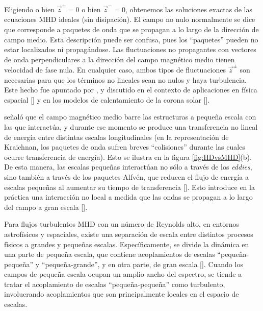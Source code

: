 Eligiendo o bien $\vec{z}^+ = 0$ o bien $\vec{z}^- = 0$, obtenemos las
soluciones exactas de las ecuaciones MHD ideales (sin disipación). El
campo no nulo normalmente se dice que corresponde a paquetes de onda
que se propagan a lo largo de la dirección de campo medio. Esta
descripción puede ser confusa, pues los ``paquetes'' pueden no estar
localizados ni propagándose. Las fluctuaciones no propagantes con
vectores de onda perpendiculares a la dirección del campo magnético
medio tienen velocidad de fase nula. En cualquier caso, ambos tipos de
fluctuaciones $\vec{z}^\pm$ son necesarias para que los términos no
lineales sean no nulos y haya turbulencia. Este hecho fue apuntado por
\cite{kraichnan_inertial-range_1965}, y discutido en el contexto de
aplicaciones en física espacial [\cite{dobrowolny_fully_1980}] y en
los modelos de calentamiento de la corona solar
[\cite{dmitruk_conditions_2001}].

\cite{kraichnan_inertial-range_1965} señaló que el campo
magnético medio barre las estructuras a pequeña escala con las que
interactúa, y durante ese momento se produce una transferencia no
lineal de energía entre distintas escalas longitudinales (en la
representación de Kraichnan, los paquetes de onda sufren breves
``colisiones'' durante las cuales ocurre transferencia de
energía). Esto se ilustra en la figura \ref{fig:HDvsMHD}(b). De esta
manera, las escalas pequeñas interactúan no sólo a través de los
\textit{eddies}, sino también a través de los paquetes Alfv\'en, que
reducen el flujo de energía a escalas pequeñas al aumentar su tiempo
de transferencia [\cite{chen_inhibition_1997}]. Esto introduce en la
práctica una interacción no local a medida que las ondas se propagan a
lo largo del campo a gran escala [\cite{gomez_validity_1999}].



Para flujos turbulentos MHD con un número de Reynolds alto, en
entornos astrofísicos y espaciales, existe una separación de escala
entre distintos procesos físicos a grandes y pequeñas
escalas. Específicamente, se divide la dinámica en una parte de
pequeña escala, que contiene acoplamientos de escalas
``pequeña-pequeña'' y ``pequeña-grande'', y en otra parte, de gran
escala [\cite{zhou_transport_1990}]. Cuando los campos de pequeña
escala ocupan un amplio ancho del espectro, se tiende a tratar el
acoplamiento de escalas ``pequeña-pequeña'' como turbulento,
involucrando acoplamientos que son principalmente locales en el
espacio de escalas.

